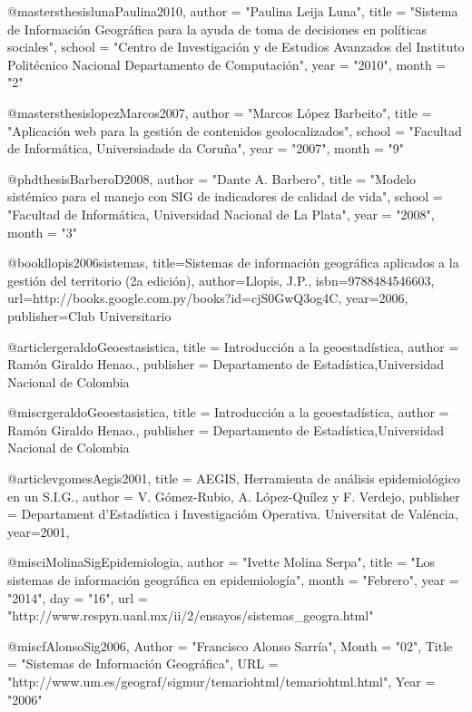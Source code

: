 
@mastersthesis{lunaPaulina2010,
    author    = "Paulina Leija Luna",
    title     = "Sistema de Información Geográfica para la ayuda de toma de decisiones en políticas sociales",
    school    = "Centro de Investigación y de Estudios Avanzados del Instituto Politécnico Nacional Departamento de Computación",
    year      = "2010",
    month     = "2"
}

@mastersthesis{lopezMarcos2007,
    author    = "Marcos López Barbeito",
    title     = "Aplicación web para la gestión de contenidos geolocalizados",
    school    = "Facultad de Informática, Universiadade da Coruña",
    year      = "2007",
    month     = "9"
}

@phdthesis{BarberoD2008,
    author    = "Dante A. Barbero",
    title     = "Modelo sistémico para el manejo con SIG de indicadores de calidad de vida",
    school    = "Facultad de Informática, Universidad Nacional de La Plata",
    year      = "2008",
    month     = "3"
}

@book{llopis2006sistemas,
  title={Sistemas de informaci{\'o}n geogr{\'a}fica aplicados a la gesti{\'o}n del territorio (2a edici{\'o}n)},
  author={Llopis, J.P.},
  isbn={9788484546603},
  url={http://books.google.com.py/books?id=cjS0GwQ3og4C},
  year={2006},
  publisher={Club Universitario}
}

@article{rgeraldoGeoestasistica,
  title = {Introducción a la geoestadística},
  author = {Ramón Giraldo Henao.},
  publisher = {Departamento de Estadística,Universidad Nacional de Colombia}
}

@misc{rgeraldoGeoestasistica,
  title = {Introducción a la geoestadística},
  author = {Ramón Giraldo Henao.},
  publisher = {Departamento de Estadística,Universidad Nacional de Colombia}
}

@article{vgomesAegis2001,
  title = {AEGIS, Herramienta de análisis epidemiológico en un S.I.G.},
  author = {V. Gómez-Rubio, A. López-Quílez y F. Verdejo},
  publisher = {Departament d’Estadística i Investigacióm Operativa. Universitat de Valéncia},
  year={2001},
}

@misc{iMolinaSigEpidemiologia,
      author = "Ivette Molina Serpa",
      title = "Los sistemas de información geográfica en epidemiología",
      month = "Febrero",
      year = "2014",
      day = "16",
      url = "http://www.respyn.uanl.mx/ii/2/ensayos/sistemas_geogra.html"
}

@misc{fAlonsoSig2006,
    Author = "Francisco Alonso Sarría",
    Month = "02",
    Title = "Sistemas de Información Geográfica",
    URL = "http://www.um.es/geograf/sigmur/temariohtml/temariohtml.html",
    Year = "2006"
}



